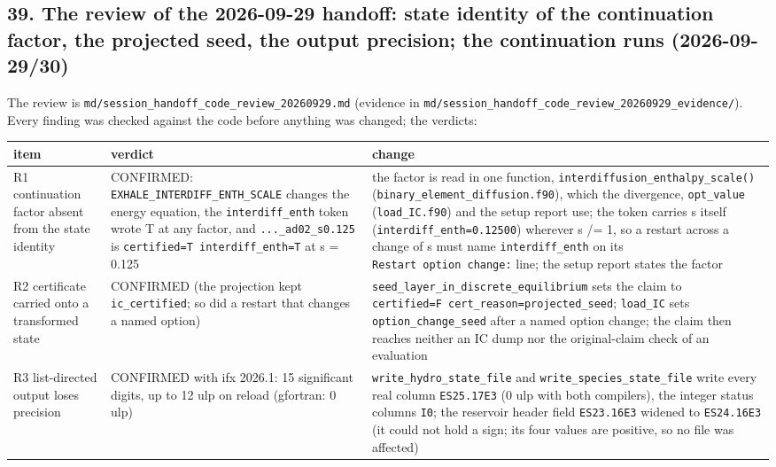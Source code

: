 \documentclass[english,a4paper]{my_memo}
\begin{document}
\subsection{39. The review of the 2026-09-29 handoff: state identity of the continuation factor, the projected seed, the output precision; the continuation runs (2026-09-29/30)}\label{39-the-review-of-the-2026-09-29-handoff-state-identity-of-the-continuation-factor-the-projected-seed-the-output-precision-the-continuation-runs-2026-09-2930}

The review is \texttt{md/session\_handoff\_code\_review\_20260929.md} (evidence in
\texttt{md/session\_handoff\_code\_review\_20260929\_evidence/}). Every finding was
checked against the code before anything was changed; the verdicts:

{\def\LTcaptype{none} %
{\small
\begin{longtable}[]{@{}lll@{}}
\toprule\noalign{}
item & verdict & change \\
\midrule\noalign{}
\endhead
\bottomrule\noalign{}
\endlastfoot
R1 continuation factor absent from the state identity & CONFIRMED: \texttt{EXHALE\_INTERDIFF\_ENTH\_SCALE} changes the energy equation, the \texttt{interdiff\_enth} token wrote T at any factor, and \texttt{...\_ad02\_s0.125} is \texttt{certified=T\ interdiff\_enth=T} at s = 0.125 & the factor is read in one function, \texttt{interdiffusion\_enthalpy\_scale()} (\texttt{binary\_element\_diffusion.f90}), which the divergence, \texttt{opt\_value} (\texttt{load\_IC.f90}) and the setup report use; the token carries s itself (\texttt{interdiff\_enth=0.12500}) wherever s /= 1, so a restart across a change of s must name \texttt{interdiff\_enth} on its \texttt{Restart\ option\ change:} line; the setup report states the factor \\
R2 certificate carried onto a transformed state & CONFIRMED (the projection kept \texttt{ic\_certified}; so did a restart that changes a named option) & \texttt{seed\_layer\_in\_discrete\_equilibrium} sets the claim to \texttt{certified=F\ cert\_reason=projected\_seed}; \texttt{load\_IC} sets \texttt{option\_change\_seed} after a named option change; the claim then reaches neither an IC dump nor the original-claim check of an evaluation \\
R3 list-directed output loses precision & CONFIRMED with ifx 2026.1: 15 significant digits, up to 12 ulp on reload (gfortran: 0 ulp) & \texttt{write\_hydro\_state\_file} and \texttt{write\_species\_state\_file} write every real column \texttt{ES25.17E3} (0 ulp with both compilers), the integer status columns \texttt{I0}; the reservoir header field \texttt{ES23.16E3} widened to \texttt{ES24.16E3} (it could not hold a sign; its four values are positive, so no file was affected) \\

\end{longtable}}}
\end{document}
